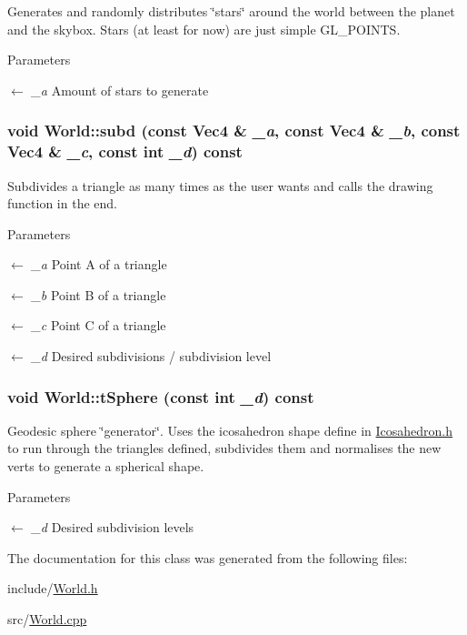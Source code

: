 Generates and randomly distributes \char`\"{}stars\char`\"{} around the world between the planet and the skybox. Stars (at least for now) are just simple GL\_\-POINTS. 
\begin{DoxyParams}{Parameters}
\item[\mbox{$\leftarrow$} {\em \_\-a}]Amount of stars to generate \end{DoxyParams}
\hypertarget{classWorld_a3bd949dfe9a3281fdf3e2523ed69942a}{
\subsubsection[{subd}]{\setlength{\rightskip}{0pt plus 5cm}void World::subd (const {\bf Vec4} \& {\em \_\-a}, \/  const {\bf Vec4} \& {\em \_\-b}, \/  const {\bf Vec4} \& {\em \_\-c}, \/  const int {\em \_\-d}) const}}
\label{classWorld_a3bd949dfe9a3281fdf3e2523ed69942a}


Subdivides a triangle as many times as the user wants and calls the drawing function in the end. 
\begin{DoxyParams}{Parameters}
\item[\mbox{$\leftarrow$} {\em \_\-a}]Point A of a triangle \item[\mbox{$\leftarrow$} {\em \_\-b}]Point B of a triangle \item[\mbox{$\leftarrow$} {\em \_\-c}]Point C of a triangle \item[\mbox{$\leftarrow$} {\em \_\-d}]Desired subdivisions / subdivision level \end{DoxyParams}
\hypertarget{classWorld_af0ea326fb21e89cbc1bec14127e8289f}{
\subsubsection[{tSphere}]{\setlength{\rightskip}{0pt plus 5cm}void World::tSphere (const int {\em \_\-d}) const}}
\label{classWorld_af0ea326fb21e89cbc1bec14127e8289f}


Geodesic sphere \char`\"{}generator\char`\"{}. Uses the icosahedron shape define in \hyperlink{Icosahedron_8h}{Icosahedron.h} to run through the triangles defined, subdivides them and normalises the new verts to generate a spherical shape. 
\begin{DoxyParams}{Parameters}
\item[\mbox{$\leftarrow$} {\em \_\-d}]Desired subdivision levels \end{DoxyParams}


The documentation for this class was generated from the following files:\begin{DoxyCompactItemize}
\item 
include/\hyperlink{World_8h}{World.h}\item 
src/\hyperlink{World_8cpp}{World.cpp}\end{DoxyCompactItemize}
